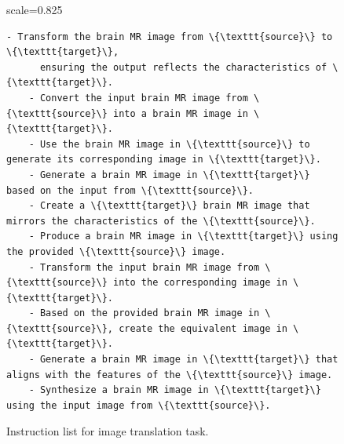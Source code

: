\begin{figure}[t]
\centering
\begin{adjustbox}{scale=0.825}
\begin{minipage}{1.2\columnwidth}
\begin{Verbatim}[frame=single, numbersep=5pt,
                 commandchars=\\\{\}]
    - Transform the brain MR image from \{\texttt{source}\} to \{\texttt{target}\}, 
      ensuring the output reflects the characteristics of \{\texttt{target}\}.
    - Convert the input brain MR image from \{\texttt{source}\} into a brain MR image in \{\texttt{target}\}.
    - Use the brain MR image in \{\texttt{source}\} to generate its corresponding image in \{\texttt{target}\}.
    - Generate a brain MR image in \{\texttt{target}\} based on the input from \{\texttt{source}\}.
    - Create a \{\texttt{target}\} brain MR image that mirrors the characteristics of the \{\texttt{source}\}.
    - Produce a brain MR image in \{\texttt{target}\} using the provided \{\texttt{source}\} image.
    - Transform the input brain MR image from \{\texttt{source}\} into the corresponding image in \{\texttt{target}\}.
    - Based on the provided brain MR image in \{\texttt{source}\}, create the equivalent image in \{\texttt{target}\}.
    - Generate a brain MR image in \{\texttt{target}\} that aligns with the features of the \{\texttt{source}\} image.
    - Synthesize a brain MR image in \{\texttt{target}\} using the input image from \{\texttt{source}\}.
\end{Verbatim}
\end{minipage}
\end{adjustbox}
\centering
\vspace{-7pt}
\caption{Instruction list for image translation task.}
\label{figG}
\vspace{-4pt}
\end{figure}


